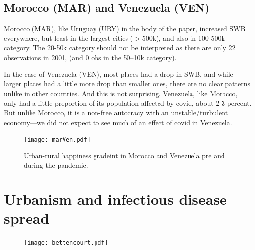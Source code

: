 \documentclass[10pt, letterpaper]{article}
\begin{document}
\begin{spacing}{1.4}


 \subsection{Morocco (MAR) and  Venezuela (VEN)}


Morocco (MAR), like Uruguay (URY) in the body of the paper, increased SWB everywhere, but
least in the largest cities ($>$500k), and also in 100-500k category. The 20-50k
category should not be interpreted as there are only 22 observations in 2001, (and 0 obs
in the 50--10k category).

In the case of Venezuela (VEN), most places had a drop in SWB, and while larger places had a little more drop than smaller ones, there are no clear patterns unlike in other
countries. And this is not surprising. Venezuela, like Morocco, only had a little proportion of
its population affected by covid, about 2-3 percent. But unlike Morocco, it is a
non-free autocracy with an unstable/turbulent economy---we did not expect to see
much of an effect of covid in Venezuela.  

 \begin{figure}[H]
  \texttt{[image: marVen.pdf]}\centering\label{marVen}
 \caption{Urban-rural happiness gradeint in Morocco and Venezuela pre and during
 the pandemic.}
 \end{figure}


\section{Urbanism and infectious disease spread}

 \begin{figure}[H]
  \texttt{[image: bettencourt.pdf]}\centering\label{marVen}
 \caption{\citet{bettencourt21}}
 \end{figure}



\end{spacing}
\end{document}
